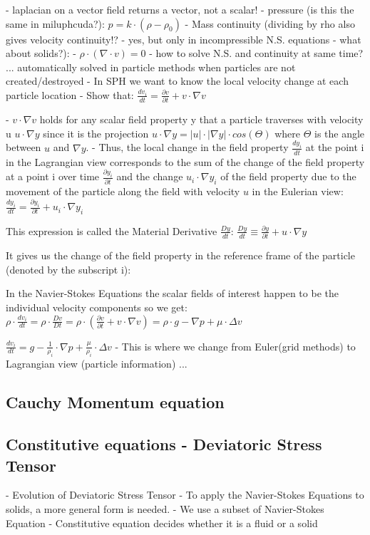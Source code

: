 - laplacian on a vector field returns a vector, not a scalar!
- pressure (is this the same in miluphcuda?):
$ p = k \cdot (\rho - \rho_0) $
- Mass continuity (dividing by rho also gives velocity continuity!? - yes, but only in incompressible N.S. equations - what about solids?):
- $\rho \cdot (\nabla \cdot v) = 0 $
- how to solve N.S. and continuity at same time? ... automatically solved in particle methods when particles are not created/destroyed
- In SPH we want to know the local velocity change at each particle location
- Show that:
$ \frac{dv_i}{dt} = \frac{\partial v}{\partial t} + v \cdot \nabla v $

- $v \cdot \nabla v $ holds for any scalar field property y that a particle traverses with velocity u $u \cdot \nabla y $ since it is the projection $u \cdot \nabla y = |u|\cdot|\nabla y| \cdot cos (\Theta)$ where $\Theta$ is the angle between $u$ and $\nabla y$.
- Thus, the local change in the field property $\frac{dy_i}{dt}$ at the point i in the Lagrangian view corresponds to the sum of the change of the field property at a point i over time $\frac{\partial y_i}{\partial t}$ and the change $u_i \cdot \nabla y_i $ of the field property due to the movement of the particle along the field with velocity $u$ in the Eulerian view:
$ \frac{dy_i}{dt} = \frac{\partial y_i}{\partial t} + u_i \cdot \nabla y_i $

This expression is called the Material Derivative $\frac{Dy}{dt}$:
$ \frac{Dy}{dt} \equiv \frac{\partial y}{\partial t} + u \cdot \nabla y $

It gives us the change of the field property in the reference frame of the particle (denoted by the subscript i):

In the Navier-Stokes Equations the scalar fields of interest happen to be the individual velocity components so we get:
$\rho \cdot \frac{dv_i}{dt} = \rho \cdot \frac{Dv}{Dt} = \rho \cdot (\frac{\partial v}{\partial t} + v \cdot \nabla v) = \rho \cdot g - \nabla p + \mu \cdot \Delta v $

$ \frac{dv_i}{dt} = g - \frac{1}{\rho_i}\cdot \nabla p + \frac{\mu}{\rho_i} \cdot \Delta  v $
- This is where we change from Euler(grid methods) to Lagrangian view (particle information) ...

\subsection{Cauchy Momentum equation}


\subsection{Constitutive equations - Deviatoric Stress Tensor}
- Evolution of Deviatoric Stress Tensor
- To apply the Navier-Stokes Equations to solids, a more general form is needed.
- We use a subset of Navier-Stokes Equation
- Constitutive equation decides whether it is a fluid or a solid

